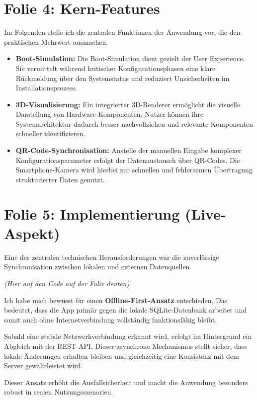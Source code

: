 \documentclass[12pt]{article}
\begin{document}
\section*{Folie 4: Kern-Features}
Im Folgenden stelle ich die zentralen Funktionen der Anwendung vor, die den praktischen Mehrwert ausmachen.

\begin{itemize}
    \item \textbf{Boot-Simulation:} Die Boot-Simulation dient gezielt der User Experience. Sie vermittelt während kritischer Konfigurationsphasen eine klare Rückmeldung über den Systemstatus und reduziert Unsicherheiten im Installationsprozess.

    \item \textbf{3D-Visualisierung:} Ein integrierter 3D-Renderer ermöglicht die visuelle Darstellung von Hardware-Komponenten. Nutzer können ihre Systemarchitektur dadurch besser nachvollziehen und relevante Komponenten schneller identifizieren.

    \item \textbf{QR-Code-Synchronisation:} Anstelle der manuellen Eingabe komplexer Konfigurationsparameter erfolgt der Datenaustausch über QR-Codes. Die Smartphone-Kamera wird hierbei zur schnellen und fehlerarmen Übertragung strukturierter Daten genutzt.
\end{itemize}

\section*{Folie 5: Implementierung (Live-Aspekt)}
Eine der zentralen technischen Herausforderungen war die zuverlässige Synchronisation zwischen lokalen und externen Datenquellen.

\textit{(Hier auf den Code auf der Folie deuten)}

Ich habe mich bewusst für einen \textbf{Offline-First-Ansatz} entschieden. Das bedeutet, dass die App primär gegen die lokale SQLite-Datenbank arbeitet und somit auch ohne Internetverbindung vollständig funktionsfähig bleibt.

Sobald eine stabile Netzwerkverbindung erkannt wird, erfolgt im Hintergrund ein Abgleich mit der REST-API. Dieser asynchrone Mechanismus stellt sicher, dass lokale Änderungen erhalten bleiben und gleichzeitig eine Konsistenz mit dem Server gewährleistet wird.

Dieser Ansatz erhöht die Ausfallsicherheit und macht die Anwendung besonders robust in realen Nutzungsszenarien.
\end{document}

